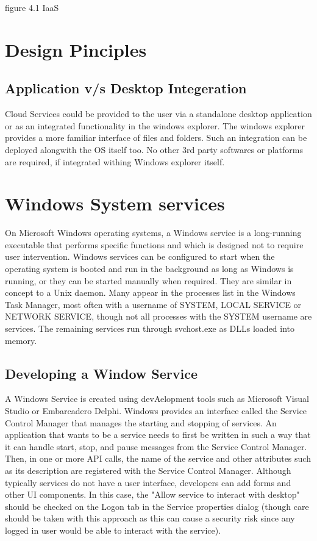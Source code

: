  
figure 4.1  IaaS



\section{Design Pinciples}

\subsection{Application v/s Desktop Integeration}

Cloud Services could be provided to the user via a standalone desktop application or as an integrated  functionality in the windows explorer. The windows explorer provides a more familiar interface of files and folders. Such an integration can be deployed alongwith the OS itself too.  No other  3rd party softwares or platforms are required, if integrated withing Windows explorer itself.
\section{Windows System services}

On Microsoft Windows operating systems, a Windows service is a long-running executable that performs specific functions and which is designed not to require user intervention. Windows services can be configured to start when the operating system is booted and run in the background as long as Windows is running, or they can be started manually when required. They are similar in concept to a Unix daemon. Many appear in the processes list in the Windows Task Manager, most often with a username of SYSTEM, LOCAL SERVICE or NETWORK SERVICE, though not all processes with the SYSTEM username are services. The remaining services run through svchost.exe as DLLs loaded into memory.

\subsection{Developing a Window Service}

A Windows Service is created using devAelopment tools such as Microsoft Visual Studio or Embarcadero Delphi. Windows provides an interface called the Service Control Manager that manages the starting and stopping of services. An application that wants to be a service needs to first be written in such a way that it can handle start, stop, and pause messages from the Service Control Manager. Then, in one or more API calls, the name of the service and other attributes such as its description are registered with the Service Control Manager. Although typically services do not have a user interface, developers can add forms and other UI components. In this case, the "Allow service to interact with desktop" should be checked on the Logon tab in the Service properties dialog (though care should be taken with this approach as this can cause a security risk since any logged in user would be able to interact with the service).

